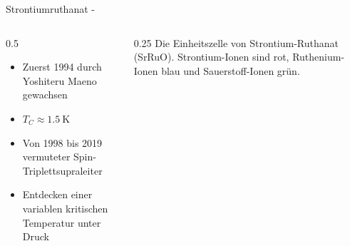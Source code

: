 \begin{frame}{Strontiumruthanat - }
    \begin{columns}
        \begin{column}{0.5\textwidth}
            \begin{itemize}
                \item Zuerst 1994 durch Yoshiteru Maeno gewachsen \cite{Maeno1994}
                \item $T_C \approx \SI{1.5}{\kelvin}$ \cite{Mackenzie2020}
                \item Von 1998 \cite{Ishida1998} bis 2019 \cite{Pustogow2019,Ishida_2020} vermuteter Spin-Triplettsupraleiter
                \item Entdecken einer variablen kritischen Temperatur unter Druck \cite{doi:10.1126/science.1248292}
            \end{itemize}
        \end{column}
        \begin{column}{0.25\textwidth}
            Die Einheitszelle von Strontium-Ruthanat (SrRuO). Strontium-Ionen sind rot, Ruthenium-Ionen blau und Sauerstoff-Ionen grün. \cite{wiki:Sr2_Ru_O4}
        \end{column}
    \end{columns}
\end{frame}

